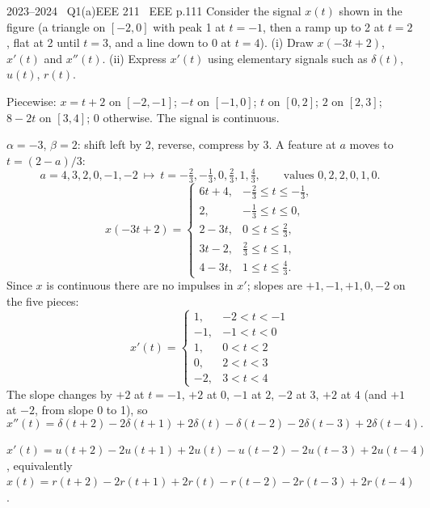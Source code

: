 \begin{qcard}{2023--2024 \textbullet\ Q1(a)}{EEE 211 \textbullet\ EEE p.1}{11}
Consider the signal $x(t)$ shown in the figure (a triangle on $[-2,0]$ with peak 1 at $t=-1$, then a ramp up to 2 at $t=2$, flat at 2 until $t=3$, and a line down to 0 at $t=4$).
(i) Draw $x(-3t+2)$, $x'(t)$ and $x''(t)$. \quad (ii) Express $x'(t)$ using elementary signals such as $\delta(t)$, $u(t)$, $r(t)$.
\end{qcard}
\begin{solution}
Piecewise: $x=t+2$ on $[-2,-1]$; $-t$ on $[-1,0]$; $t$ on $[0,2]$; $2$ on $[2,3]$; $8-2t$ on $[3,4]$; $0$ otherwise. The signal is continuous.

 $\alpha=-3$, $\beta=2$: shift left by 2, reverse, compress by 3. A feature at $a$ moves to $t=(2-a)/3$:
\[
a=4,3,2,0,-1,-2\ \longmapsto\ t=-\tfrac23,-\tfrac13,0,\tfrac23,1,\tfrac43,\qquad\text{values }0,2,2,0,1,0 .
\]
\[
x(-3t+2)=\begin{cases}6t+4,&-\frac23\le t\le-\frac13,\\2,&-\frac13\le t\le0,\\2-3t,&0\le t\le\frac23,\\3t-2,&\frac23\le t\le1,\\4-3t,&1\le t\le\frac43.\end{cases}
\]
 Since $x$ is continuous there are no impulses in $x'$; slopes are $+1,-1,+1,0,-2$ on the five pieces:
\[x'(t)=\begin{cases}1,&-2<t<-1\\-1,&-1<t<0\\1,&0<t<2\\0,&2<t<3\\-2,&3<t<4\end{cases}\]
The slope changes by $+2$ at $t=-1$, $+2$ at $0$, $-1$ at $2$, $-2$ at $3$, $+2$ at $4$ (and $+1$ at $-2$, from slope 0 to 1), so
\[x''(t)=\delta(t+2)-2\delta(t+1)+2\delta(t)-\delta(t-2)-2\delta(t-3)+2\delta(t-4).\]
\begin{center}
\hspace{1mm}
\hspace{1mm}
\end{center}
 $x'(t)=u(t+2)-2u(t+1)+2u(t)-u(t-2)-2u(t-3)+2u(t-4)$, equivalently $x(t)=r(t+2)-2r(t+1)+2r(t)-r(t-2)-2r(t-3)+2r(t-4)$.
\end{solution}

